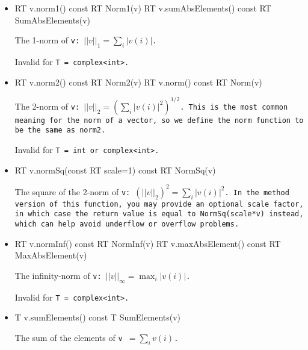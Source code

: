 \begin{itemize}

\item
\begin{tmvcode}
RT v.norm1() const
RT Norm1(v)
RT v.sumAbsElements() const
RT SumAbsElements(v)
\end{tmvcode}
The 1-norm of \tt{v}: $||v||_1 = \sum_i |v(i)|$.  

Invalid for \tt{T = complex<int>}.

\item
\begin{tmvcode}
RT v.norm2() const
RT Norm2(v)
RT v.norm() const
RT Norm(v)
\end{tmvcode}
The 2-norm of \tt{v}: $||v||_2 = (\sum_i |v(i)|^2)^{1/2}$.
This is the most common meaning for the norm of a vector, so we
define the \tt{norm} function to be the same as \tt{norm2}.  

Invalid for \tt{T = int} or \tt{complex<int>}.

\item
\begin{tmvcode}
RT v.normSq(const RT scale=1) const
RT NormSq(v)
\end{tmvcode}
The square of the 2-norm of \tt{v}: $(||v||_2)^2 = \sum_i |v(i)|^2$.
In the method version of this function, you may provide an optional scale factor,
in which case the return value is equal to NormSq(scale*v) instead, 
which can help avoid underflow or overflow problems.

\item
\begin{tmvcode}
RT v.normInf() const
RT NormInf(v)
RT v.maxAbsElement() const
RT MaxAbsElement(v)
\end{tmvcode}
The infinity-norm of \tt{v}: $||v||_\infty = \max_i |v(i)|$.  

Invalid for \tt{T = complex<int>}.

\item
\begin{tmvcode}
T v.sumElements() const
T SumElements(v)
\end{tmvcode}
The sum of the elements of \tt{v} $= \sum_i v(i)$.


\end{itemize}

